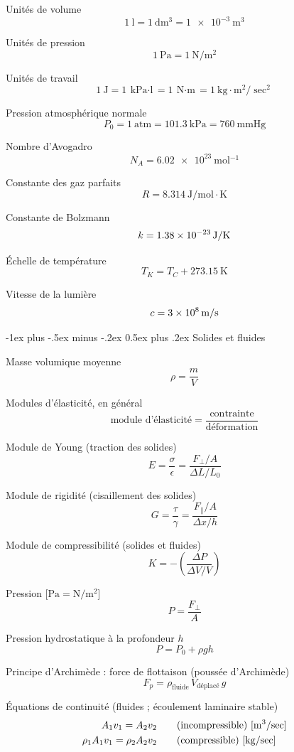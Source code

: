 \documentclass[10pt,landscape]{article}
\makeatletter
\renewcommand{\section}{\@startsection{section}{1}{0mm}%
                                {-1ex plus -.5ex minus -.2ex}%
                                {0.5ex plus .2ex}%
                                {\normalfont\large\bfseries}}
\makeatother
\begin{document}
\begin{multicols}{3}
Unités de volume
\[ \SI{1}{\litre} = \SI{1}{\deci\meter^3} =  \SI{1e-3}{\meter^3} \]

Unités de pression
\[ \SI{1}{\pascal} = \SI{1}{\newton/\meter^2} \]

Unités de travail
\[ \SI{1}{\joule} = \SI{1}{\kilo\pascal\cdot\litre} = \SI{1}{\newton\cdot\meter} = \SI{1}{\kilo\gram\cdot\metre^2/\sec^2} \]

Pression atmosphérique normale
\[ P_0 = \SI{1}{\text{atm}} = \SI{101,3}{\kilo\pascal}
= \SI{760}{\mmHg} \]

Nombre d'Avogadro
\[ N_A = \SI{6,02e23}{\mol^{-1}}\]

Constante des gaz parfaits
\[ R = \SI{8,314}{\joule/\mole\cdot\kelvin} \]

Constante de Bolzmann
\[ k = \SI{1,38E-23}{\joule/\kelvin} \]

Échelle de température
\[ T_K = T_C + \SI{273,15}{\kelvin} \]

Vitesse de la lumière
\[ c = \SI{3E8}{\meter/\second}  \]

\hrulefill


\section{Solides et fluides}

Masse volumique moyenne
\[ \rho = \frac{m}{V} \]

Modules d'élasticité, en général
\[ \text{module d'élasticité} = \frac{\text{contrainte}}{\text{déformation}} \]

Module de Young (traction des solides)
\[ E = \frac{\sigma}{\epsilon} 
= \frac{{F_\perp}/{A}}{{\Delta L}/{L_0}} 
\]

Module de rigidité (cisaillement des solides)
\[ G = \frac{\tau}{\gamma} 
= \frac{F_\parallel/A}{{\Delta x}/{h}} 
\]

Module de compressibilité (solides et fluides)
\[ K = - \left(\frac{\Delta P}{\Delta V / V} \right)\]

Pression [$\si{\pascal} = \si{\newton/\metre^2}$]
\[ P = \frac{F_\perp}{A} \]

Pression hydrostatique à la profondeur $h$
\[ P = P_0 + \rho gh \]

Principe d'Archimède : force de flottaison (poussée d'Archimède)
\[ F_p = \rho_\text{fluide} \, V_\text{déplacé} \, g \]

Équations de continuité (fluides ; écoulement laminaire stable)
\begin{align*}
	A_1 v_1 = A_2 v_2 \qquad &\text{(incompressible) [\si{\meter^3/\sec]}} \\
	\rho_1 A_1 v_1 = \rho_2 A_2 v_2 \qquad &\text{(compressible) [\si{\kilogram/\sec}]}
\end{align*}


\end{multicols}
\end{document}
